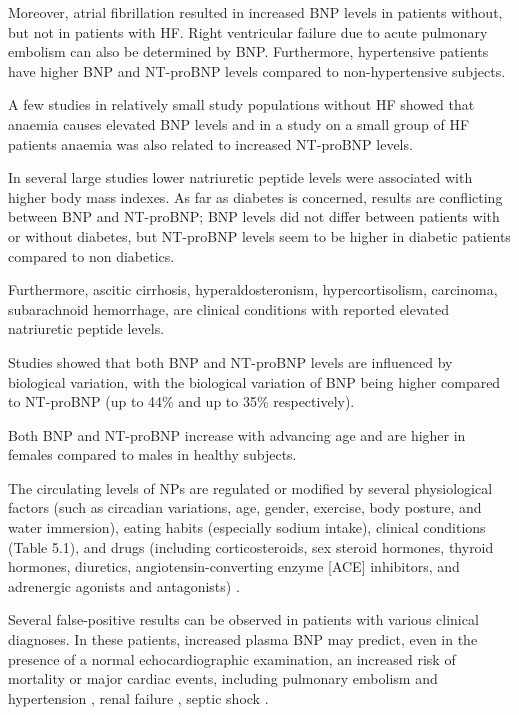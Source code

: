\documentclass[14pt,a4paper,onecolumn]{extarticle}
\begin{document}
Moreover, atrial fibrillation resulted in increased BNP levels in patients without, but not in patients with HF. \citep{Knudsen2005} Right ventricular failure due to acute pulmonary embolism can also be determined by BNP. \citep{Tulevski2002} Furthermore, hypertensive patients have higher BNP and NT-proBNP levels compared to non-hypertensive subjects. \citep{Boomsma2001}

A few studies in relatively small study populations without HF showed that anaemia causes elevated BNP levels \citep{Tsuji2004,Willis2005,Wold2005} and in a study on a small group of HF patients anaemia was also related to increased NT-proBNP levels. \citep{Wu2005}

In several large studies lower natriuretic peptide levels were associated with higher body mass indexes. \citep{Das2005,Krauser2005,Mehra2004,Wang2004b} As far as diabetes is concerned, results are conflicting between BNP and NT-proBNP; BNP levels did not differ between patients with or without diabetes, \citep{Wu2004} but NT-proBNP levels seem to be higher in diabetic patients compared to non diabetics. \citep{Magnusson2004}

Furthermore, ascitic cirrhosis, hyperaldosteronism, hypercortisolism, carcinoma, subarachnoid hemorrhage, \citep{Pfister2004} are clinical conditions with reported elevated natriuretic peptide levels.

Studies showed that both BNP and NT-proBNP levels are influenced by biological variation, with the biological variation of BNP being higher compared to NT-proBNP (up to 44\% and up to 35\% respectively). \citep{Bruins2004,Wu2003b}

Both BNP and NT-proBNP increase with advancing age and are higher in females compared to males in healthy subjects. \citep{Raymond2003}

The circulating levels of NPs are regulated or modified by several physiological factors (such as circadian variations, age, gender, exercise, body posture, and water immersion), eating habits (especially sodium intake), clinical conditions (Table 5.1), and drugs (including corticosteroids, sex steroid hormones, thyroid hormones, diuretics, angiotensin-converting enzyme [ACE] inhibitors, and adrenergic agonists and antagonists) \citep{bib31} \citep{bib32} \citep{bib33} \citep{bib34} \citep{bib35} \citep{bib36}.

Several false-positive results can be observed in patients with various clinical diagnoses. In these patients, increased plasma BNP may predict, even in the presence of a normal echocardiographic examination, an increased risk of mortality or major cardiac events, including pulmonary embolism \citep{121} \citep{123} \citep{bib382} and hypertension \citep{bib383}, renal failure \citep{bib384} \citep{bib385}, septic shock \citep{bib386}.
\end{document}
